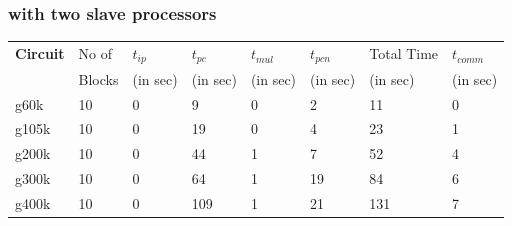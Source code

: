 \documentclass[12pt,psfig,a4]{article}
\begin{document}
\subsubsection{with two slave processors}
\tiny
\begin{table}[ht]
\begin{center}
\begin{tabular}{|l|l|l|l|l|l|l|l|} 
\hline
{\bf Circuit} & No of & $t_{ip}$ & $t_{pc}$ & $t_{mul}$ &  $t_{pcn}$ & Total Time & $t_{comm}$ \\ 
              & Blocks& (in sec)& (in sec)  & (in sec)  &  (in sec)  & (in sec)   & (in sec)   \\ \hline 
g60k&  \hspace{0.2in}10& \hspace{0.2in}0 & \hspace{0.2in} 9  & \hspace{0.2in}0 & \hspace{0.2in}2& \hspace{0.2in}11& \hspace{0.2in}   0 \\ \hline 
g105k& \hspace{0.2in}10& \hspace{0.2in}0 & \hspace{0.2in}19  & \hspace{0.2in}0 & \hspace{0.2in}4& \hspace{0.2in}23& \hspace{0.2in}   1 \\ \hline 
g200k& \hspace{0.2in}10& \hspace{0.2in}0 & \hspace{0.2in}44  & \hspace{0.2in}1 & \hspace{0.2in}7& \hspace{0.2in}52& \hspace{0.2in}   4 \\ \hline 
g300k& \hspace{0.2in}10& \hspace{0.2in}0 & \hspace{0.2in}64  & \hspace{0.2in}1 & \hspace{0.2in}19& \hspace{0.2in}84& \hspace{0.2in}   6 \\ \hline 
g400k& \hspace{0.2in}10& \hspace{0.2in}0 & \hspace{0.2in}109 & \hspace{0.2in}1 & \hspace{0.2in}21& \hspace{0.2in}131& \hspace{0.2in} 7 \\ \hline 

\end{tabular}
\end{center}
\end{table}
\end{document}

